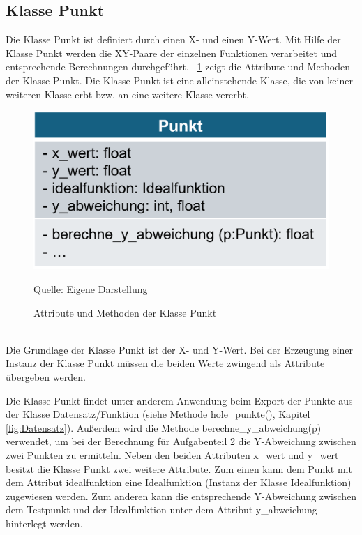 \documentclass[
    a4paper, 								%
    oneside, 								%
    11pt, 									%
    listof=totoc, 					%
    bibliography=totoc, 		%
    final, 									%
    numbers=noenddot
]{scrreprt}
\newcommand{\abbildung}[1]{\figurename\ \ref{#1}}
\begin{document}
\subsection{Klasse Punkt}
\label{sub:Punkt}
Die Klasse Punkt ist definiert durch einen X- und einen Y-Wert. Mit Hilfe der Klasse Punkt werden die XY-Paare der einzelnen Funktionen verarbeitet und entsprechende Berechnungen durchgeführt. \abbildung{fig:Punkt} zeigt die Attribute und Methoden der Klasse Punkt. Die Klasse Punkt ist eine alleinstehende Klasse, die von keiner weiteren Klasse erbt bzw. an eine weitere Klasse vererbt.
\begin{figure}[!h]
	\centering
	\caption{Attribute und Methoden der Klasse Punkt}
	\vspace{6pt}
	\includegraphics[scale=0.78]{Grafik_Klasse_Punkt}
	\vspace{6pt}
	
	Quelle: Eigene Darstellung
	\label{fig:Punkt}
\end{figure}
\\Die Grundlage der Klasse Punkt ist der X- und Y-Wert. Bei der Erzeugung einer Instanz der Klasse Punkt müssen die beiden Werte zwingend als Attribute übergeben werden. 

Die Klasse Punkt findet unter anderem Anwendung beim Export der Punkte aus der Klasse Datensatz/Funktion (siehe Methode hole\_punkte(), Kapitel \ref{fig:Datensatz}). Außerdem wird die Methode berechne\_y\_abweichung(p) verwendet, um bei der Berechnung für Aufgabenteil 2 die Y-Abweichung zwischen zwei Punkten zu ermitteln. Neben den beiden Attributen x\_wert und y\_wert besitzt die Klasse Punkt zwei weitere Attribute. Zum einen kann dem Punkt mit dem Attribut idealfunktion eine Idealfunktion (Instanz der Klasse Idealfunktion) zugewiesen werden. Zum anderen kann die entsprechende Y-Abweichung zwischen dem Testpunkt und der Idealfunktion unter dem Attribut y\_abweichung hinterlegt werden. 
\end{document}
